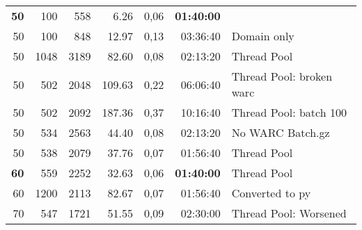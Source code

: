 \begin{table}[!ht]
\begin{tabular}{rrrrrrl}
    \textbf{50}  & 100          & 558          & 6.26         & 0,06         & \textbf{01:40:00} &                          \\
    50           & 100          & 848          & 12.97        & 0,13         & 03:36:40          & Domain only              \\
    50           & 1048         & 3189         & 82.60        & 0,08         & 02:13:20          & Thread Pool              \\
    50           & 502          & 2048         & 109.63       & 0,22         & 06:06:40          & Thread Pool: broken warc \\
    50           & 502          & 2092         & 187.36       & 0,37         & 10:16:40          & Thread Pool: batch 100   \\
    50           & 534          & 2563         & 44.40        & 0,08         & 02:13:20          & No WARC Batch.gz         \\
    50           & 538          & 2079         & 37.76        & 0,07         & 01:56:40          & Thread Pool              \\
    \textbf{60}  & 559          & 2252         & 32.63        & 0,06         & \textbf{01:40:00} & Thread Pool              \\
    60           & 1200         & 2113         & 82.67        & 0,07         & 01:56:40          & Converted to py          \\
    70           & 547          & 1721         & 51.55        & 0,09         & 02:30:00          & Thread Pool: Worsened    \\
  \end{tabular}
\end{table}

